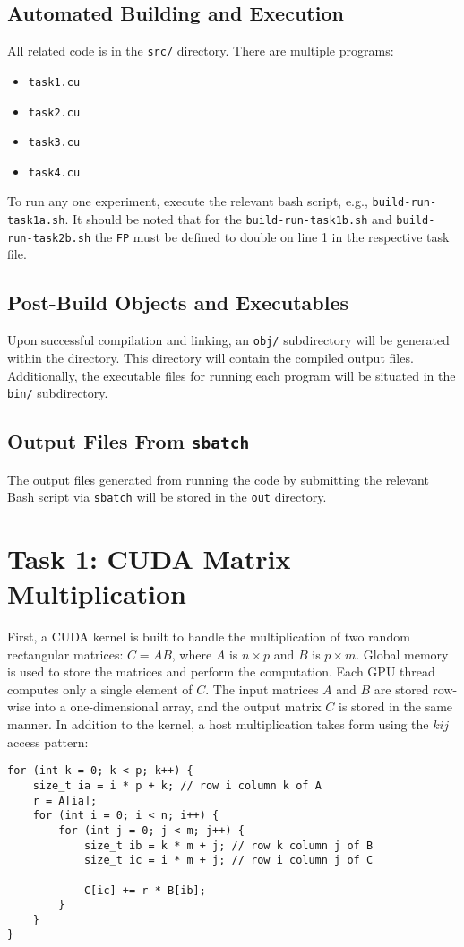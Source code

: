 \documentclass{article}
\begin{document}
\subsection{Automated Building and Execution}
All related code is in the \texttt{src/} directory.
There are multiple programs: 
\begin{multicols}{2}
    \begin{itemize}
        \item \texttt{task1.cu}
        \item \texttt{task2.cu}
        \item \texttt{task3.cu}
        \item \texttt{task4.cu}
    \end{itemize}
\end{multicols}
\noindent To run any one experiment, execute the relevant bash script, e.g., \texttt{build-run-task1a.sh}. It should be 
noted that for the \texttt{build-run-task1b.sh} and \texttt{build-run-task2b.sh} the \texttt{FP} must be defined to double on line 1 in 
the respective task file.

\subsection{Post-Build Objects and Executables}
Upon successful compilation and linking, an \texttt{obj/} subdirectory will be generated within the directory. 
This directory will contain the compiled output files. Additionally, the executable files for running each program will be 
situated in the \texttt{bin/} subdirectory.

\subsection{Output Files From \texttt{sbatch}}
The output files generated from running the code by submitting the relevant Bash script via \texttt{sbatch} will be 
stored in the \texttt{out} directory. 

\section{Task 1: CUDA Matrix Multiplication}
First, a CUDA kernel is built to handle the multiplication of two 
random rectangular matrices: $C = AB$, where $A$ is $n \times p$ and $B$ is $p \times m$. 
Global memory is used to store the matrices and 
perform the computation. Each GPU thread computes only a single element of $C$. 
The input matrices $A$ and $B$ are stored row-wise into a one-dimensional array, 
and the output matrix $C$ is stored in the same manner. In addition to the kernel, a host multiplication takes form using the $kij$ access pattern:
\begin{lstlisting}
for (int k = 0; k < p; k++) {
    size_t ia = i * p + k; // row i column k of A
    r = A[ia];
    for (int i = 0; i < n; i++) {
        for (int j = 0; j < m; j++) {
            size_t ib = k * m + j; // row k column j of B
            size_t ic = i * m + j; // row i column j of C

            C[ic] += r * B[ib];
        }
    }
}
\end{lstlisting}
\end{document}
